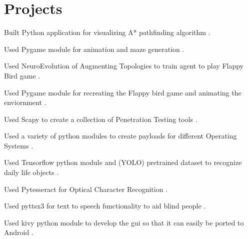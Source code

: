 \documentclass[]{deedy-resume-openfont}
\begin{document}
\begin{minipage}[t]{0.66\textwidth} 


\section{Projects}
\href{https://github.com/arynn-gupta/bullseye}{}
\vspace{\topsep}
\begin{tightemize}
\item Built Python application for visualizing A* pathfinding algorithm .
\item Used Pygame module for animation and maze generation .
\end{tightemize}
\sectionsep

\href{https://github.com/arynn-gupta/flappy.ai}{}
\begin{tightemize}
\item Used NeuroEvolution of Augmenting Topologies to train agent to play Flappy Bird game .
\item Used Pygame module for recreating the Flappy bird game and animating the enviornment  .
\end{tightemize}
\sectionsep

\href{https://github.com/arynn-gupta/Penetration_Testing}{}
\begin{tightemize}
\item Used Scapy to create a collection of Penetration Testing tools .
\item Used a variety of python modules to create payloads for different Operating Systems .
\end{tightemize}
\sectionsep

\href{https://github.com/arynn-gupta/Projekt}{}
\begin{tightemize}
\item Used Tensorflow python module and (YOLO) pretrained dataset to recognize daily life objects .
\item Used Pytesseract for Optical Character Recognition .
\item Used pyttsx3 for text to speech functionality to aid blind people .
\item Used kivy python module to develop the gui so that it can easily be ported to Android .
\end{tightemize}
\sectionsep


\end{minipage}
\end{document}
